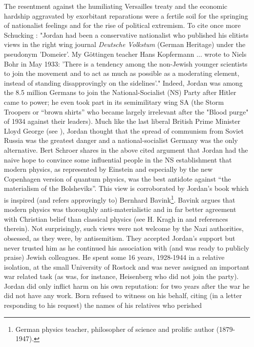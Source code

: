 The resentment against the humiliating Versailles treaty and the economic hardship aggravated by
exorbitant reparations were a fertile soil for the springing of nationalist feelings and for the
rise of political extremism. To cite once more Schucking \cite{Sch99}: "Jordan had been a conservative nationalist who published his 
elitists views in the right wing journal {\it Deutsche Volkstum} (German Heritage) under the pseudonym 'Domeier'. My 
G\"ottingen teacher Hans Kopfermann ... wrote to Niels Bohr in May 1933: 'There is a tendency among the non-Jewish younger scientists 
to join the movement and to act as much as possible as a moderating element, instead of standing disapprovingly on the sidelines'."
Indeed, Jordan was among the 8.5 million Germans to join the National-Socialist (NS) Party after Hitler came to power; he even took part 
in its semimilitary wing SA (the Storm Troopers or ``brown shirts'' who became largely irrelevant after the "Blood purge" of 1934 against their leaders). 
Much like the last liberal British Prime Minister Lloyd George (see \cite{CMM}), Jordan thought that the spread of communism from Soviet 
Russia was the greatest danger and a national-socialist Germany was the only alternative. Bert Schroer shares
in \cite{PJ07} the above cited argument that Jordan had the naive hope to convince some influential people in the NS
establishment that modern physics, as represented by Einstein and especially by
the new Copenhagen version of quantum physics, was the best antidote against
``the materialism of the Bolsheviks''. This view is corroborated by Jordan's
book \cite{J36} which is inspired (and refers approvingly to) Bernhard Bavink\footnote{German physics
teacher, philosopher of science and prolific author (1879-1947).}. Bavink argues that modern physics
was thoroughly anti-materialistic and in far better agreement with Christian belief than classical
physics (see H. Kragh in \cite{PJ07} and references therein). Not surprisingly, such views were not
welcome by the Nazi authorities, obsessed, as they were, by antisemitism. They accepted Jordan's support
but never trusted him as he continued his association with (and was ready to publicly praise) Jewish
colleagues. He spent some 16 years, 1928-1944 in a relative isolation, at the small University of Rostock
and was never assigned an important war related task (as was, for instance, Heisenberg who did not join the
party). Jordan did only inflict harm on his own reputation: for two years after the war he did not have any
work. Born refused to witness on his behalf, citing (in a letter responding to his request) the names of his relatives who perished 
